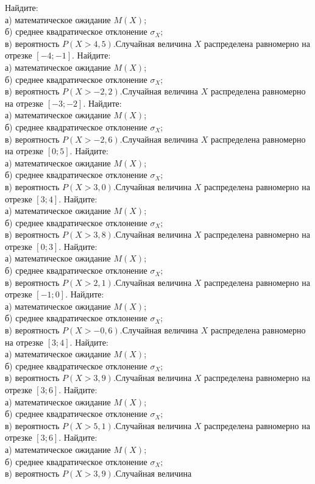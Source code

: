 Найдите: \\ \quad а) математическое ожидание $M(X)$; \\ \quad б) среднее квадратическое отклонение $\sigma_X$; \\ \quad в) вероятность $P(X>4{,}5)$.Случайная величина $X$ распределена равномерно на отрезке $[-4; -1]$. Найдите: \\ \quad а) математическое ожидание $M(X)$; \\ \quad б) среднее квадратическое отклонение $\sigma_X$; \\ \quad в) вероятность $P(X>-2{,}2)$.Случайная величина $X$ распределена равномерно на отрезке $[-3; -2]$. Найдите: \\ \quad а) математическое ожидание $M(X)$; \\ \quad б) среднее квадратическое отклонение $\sigma_X$; \\ \quad в) вероятность $P(X>-2{,}6)$.Случайная величина $X$ распределена равномерно на отрезке $[0; 5]$. Найдите: \\ \quad а) математическое ожидание $M(X)$; \\ \quad б) среднее квадратическое отклонение $\sigma_X$; \\ \quad в) вероятность $P(X>3{,}0)$.Случайная величина $X$ распределена равномерно на отрезке $[3; 4]$. Найдите: \\ \quad а) математическое ожидание $M(X)$; \\ \quad б) среднее квадратическое отклонение $\sigma_X$; \\ \quad в) вероятность $P(X>3{,}8)$.Случайная величина $X$ распределена равномерно на отрезке $[0; 3]$. Найдите: \\ \quad а) математическое ожидание $M(X)$; \\ \quad б) среднее квадратическое отклонение $\sigma_X$; \\ \quad в) вероятность $P(X>2{,}1)$.Случайная величина $X$ распределена равномерно на отрезке $[-1; 0]$. Найдите: \\ \quad а) математическое ожидание $M(X)$; \\ \quad б) среднее квадратическое отклонение $\sigma_X$; \\ \quad в) вероятность $P(X>-0{,}6)$.Случайная величина $X$ распределена равномерно на отрезке $[3; 4]$. Найдите: \\ \quad а) математическое ожидание $M(X)$; \\ \quad б) среднее квадратическое отклонение $\sigma_X$; \\ \quad в) вероятность $P(X>3{,}9)$.Случайная величина $X$ распределена равномерно на отрезке $[3; 6]$. Найдите: \\ \quad а) математическое ожидание $M(X)$; \\ \quad б) среднее квадратическое отклонение $\sigma_X$; \\ \quad в) вероятность $P(X>5{,}1)$.Случайная величина $X$ распределена равномерно на отрезке $[3; 6]$. Найдите: \\ \quad а) математическое ожидание $M(X)$; \\ \quad б) среднее квадратическое отклонение $\sigma_X$; \\ \quad в) вероятность $P(X>3{,}9)$.Случайная величина 